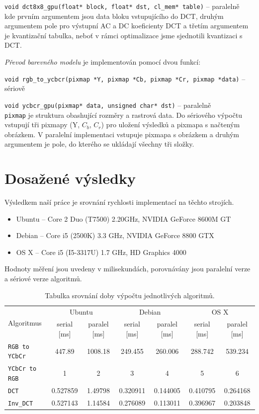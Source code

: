 \documentclass[11pt,a4paper]{article}
\begin{document}
\texttt{void dct8x8\_gpu(float* block, float* dst, cl\_mem* table)} -- paralelně\\
kde prvním argumentem jsou data bloku vstupujícího do DCT, druhým argumentem pole pro výstupní AC a DC koeficienty DCT
a třetím argumentem je kvantizační tabulka, neboť v rámci optimalizace jsme sjednotili kvantizaci s DCT.

\textit{Převod barevného modelu} je implementován pomocí dvou funkcí:

\texttt{void rgb\_to\_ycbcr(pixmap *Y, pixmap *Cb, pixmap *Cr, pixmap *data)} -- sériově

\texttt{void ycbcr\_gpu(pixmap* data, unsigned char* dst)} -- paralelně\\
\texttt{pixmap} je struktura obashující rozměry a rastrová data. Do sériového výpočtu vstupují tři pixmapy (Y, $C_b$, $C_r$) pro uložení výsledků a pixmapa s načteným obrázkem. V paralelní implementaci vstupuje pixmapa s obrázkem a druhým argumentem je pole, do kterého se ukládají všechny tři složky. 

\section{Dosažené výsledky}
Výsledkem naší práce je srovnání rychlosti implementací na těchto strojích.
\begin{itemize}
\item Ubuntu -- Core 2 Duo (T7500) 2.20GHz, NVIDIA GeForce 8600M GT
\item Debian -- Core i5 (2500K) 3.3 GHz, NVIDIA GeForce 8800 GTX
\item OS X -- Core i5 (I5-3317U) 1.7 GHz, HD Graphics 4000
\end{itemize}
Hodnoty měření jsou uvedeny v milisekundách, porovnávány jsou paralelní verze a sériové verze algoritmů.

\begin{table}[H]
\begin{center}
\renewcommand{\arraystretch}{1.3} %
\begin{tabular}{|l|cc|cc|cc|}\hline%
\multirow{2}{*}{Algoritmus}&\multicolumn{2}{|c|}{Ubuntu}&\multicolumn{2}{|c|}{Debian}&\multicolumn{2}{|c|}{OS X}\\
          &serial [ms]&paralel [ms]&serial [ms]&paralel [ms]&serial [ms]&paralel [ms]\\\hline%
\texttt{RGB to YCbCr}&447.89&1008.18&249.455&260.006&288.742&539.234\\
\texttt{YCbCr to RGB}&1&2&3&4&5&6\\
\texttt{DCT}         &0.527859&1.49798&0.320911&0.144005&0.410795&0.264168\\
\texttt{Inv\_DCT}    &0.527143&1.14584&0.276089&0.113011&0.396967&0.203848\\
\hline
\end{tabular}
\renewcommand{\arraystretch}{1} %
\end{center}
\caption{Tabulka srovnání doby výpočtu jednotlivých algoritmů.}
\label{ps_history}
\end{table}
\end{document}
